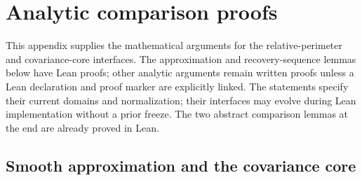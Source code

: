 \appendix
\chapter{Analytic comparison proofs}
\label{chap:analytic-comparison-proofs}

This appendix supplies the mathematical arguments for the relative-perimeter and covariance-core
interfaces. The approximation and recovery-sequence lemmas below have Lean proofs; other analytic
arguments remain written proofs unless a Lean declaration and proof marker are explicitly linked.
The statements specify their current domains and normalization; their interfaces may evolve
during Lean implementation without a prior freeze.
The two abstract comparison lemmas at the end are already proved in Lean.

\section{Smooth approximation and the covariance core}

